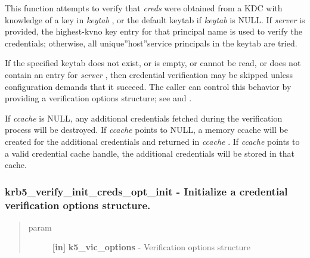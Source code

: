 \documentclass[letterpaper,10pt,english]{sphinxmanual}
\begin{document}
This function attempts to verify that \emph{creds} were obtained from a KDC with knowledge of a key in \emph{keytab} , or the default keytab if \emph{keytab} is NULL. If \emph{server} is provided, the highest-kvno key entry for that principal name is used to verify the credentials; otherwise, all unique''host''service principals in the keytab are tried.

If the specified keytab does not exist, or is empty, or cannot be read, or does not contain an entry for \emph{server} , then credential verification may be skipped unless configuration demands that it succeed. The caller can control this behavior by providing a verification options structure; see {\hyperref[appdev/refs/api/krb5_verify_init_creds_opt_init:krb5_verify_init_creds_opt_init]{}} and {\hyperref[appdev/refs/api/krb5_verify_init_creds_opt_set_ap_req_nofail:krb5_verify_init_creds_opt_set_ap_req_nofail]{}} .

If \emph{ccache} is NULL, any additional credentials fetched during the verification process will be destroyed. If \emph{ccache} points to NULL, a memory ccache will be created for the additional credentials and returned in \emph{ccache} . If \emph{ccache} points to a valid credential cache handle, the additional credentials will be stored in that cache.


\subsubsection{krb5\_verify\_init\_creds\_opt\_init -  Initialize a credential verification options structure.}
\label{appdev/refs/api/krb5_verify_init_creds_opt_init:krb5-verify-init-creds-opt-init-initialize-a-credential-verification-options-structure}\label{appdev/refs/api/krb5_verify_init_creds_opt_init::doc}

\begin{fulllineitems}
\label{appdev/refs/api/krb5_verify_init_creds_opt_init:krb5_verify_init_creds_opt_init}
\end{fulllineitems}

\begin{quote}\begin{description}
\item[{param}] \leavevmode
\textbf{{[}in{]}} \textbf{k5\_vic\_options} - Verification options structure

\end{description}\end{quote}
\end{document}
